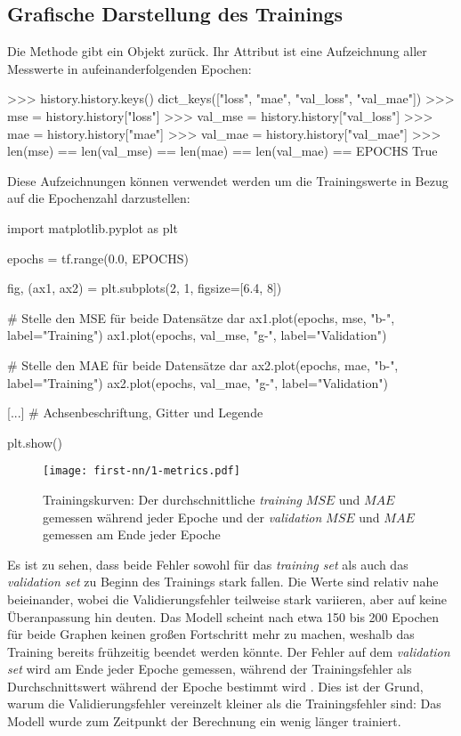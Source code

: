 \subsection{Grafische Darstellung des Trainings}
Die  Methode gibt ein  Objekt zurück.
Ihr  Attribut
ist eine Aufzeichnung aller Messwerte in aufeinanderfolgenden Epochen:
\begin{pyconcode}
>>> history.history.keys()
dict_keys(["loss", "mae", "val_loss", "val_mae"])
>>> mse = history.history["loss"]
>>> val_mse = history.history["val_loss"]
>>> mae = history.history["mae"]
>>> val_mae = history.history["val_mae"]
>>> len(mse) == len(val_mse) == len(mae) == len(val_mae) == EPOCHS
True
\end{pyconcode}
Diese Aufzeichnungen können verwendet werden um die Trainingswerte
in Bezug auf die Epochenzahl darzustellen:
\begin{pythoncode}
import matplotlib.pyplot as plt

epochs = tf.range(0.0, EPOCHS)

fig, (ax1, ax2) = plt.subplots(2, 1, figsize=[6.4, 8])

# Stelle den MSE für beide Datensätze dar
ax1.plot(epochs, mse, "b-", label="Training")
ax1.plot(epochs, val_mse, "g-", label="Validation")

# Stelle den MAE für beide Datensätze dar
ax2.plot(epochs, mae, "b-", label="Training")
ax2.plot(epochs, val_mae, "g-", label="Validation")

[...] # Achsenbeschriftung, Gitter und Legende

plt.show()
\end{pythoncode}
\begin{figure}[h!]
  \centering
  \texttt{[image: first-nn/1-metrics.pdf]}
  \caption{Trainingskurven: Der durchschnittliche \textit{training}
  $MSE$ und $MAE$ gemessen während jeder Epoche
  und der \textit{validation} $MSE$ und $MAE$
  gemessen am Ende jeder Epoche}
\end{figure}
\noindent
Es ist zu sehen, dass beide Fehler sowohl für das
\textit{training set} als auch das \textit{validation set}
zu Beginn des Trainings stark fallen.
Die Werte sind relativ nahe beieinander, wobei die Validierungsfehler
teilweise stark variieren, aber auf keine Überanpassung hin deuten.
Das Modell scheint nach etwa 150 bis 200 Epochen für beide Graphen
keinen großen Fortschritt mehr zu machen, weshalb
das Training bereits frühzeitig beendet werden könnte.
Der Fehler auf dem \textit{validation set} wird
am Ende jeder Epoche gemessen, während der Trainingsfehler als Durchschnittswert
während der Epoche bestimmt wird \parencite[305]{book:hands-on-ml}.
Dies ist der Grund, warum die Validierungsfehler
vereinzelt kleiner als die Trainingsfehler sind:
Das Modell wurde zum Zeitpunkt der Berechnung ein wenig länger trainiert.

